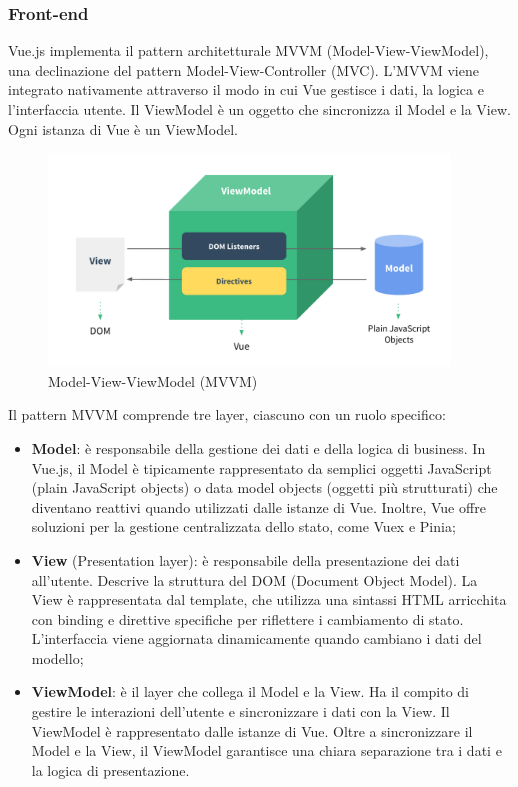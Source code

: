 \subsubsection{Front-end}

\par Vue.js implementa il pattern architetturale MVVM (Model-View-ViewModel), una declinazione del pattern Model-View-Controller (MVC). L’MVVM viene integrato nativamente attraverso il modo in cui Vue gestisce i dati, la logica e l'interfaccia utente. Il ViewModel è un oggetto che sincronizza il Model e la View. Ogni istanza di Vue è un ViewModel.

\begin{figure}[H]
  \centering
  \includegraphics[width=0.95\textwidth]{assets/Frontend/architettura_mvvm.png}
  \caption{Model-View-ViewModel (MVVM)}
\end{figure}

\par Il pattern MVVM comprende tre layer, ciascuno con un ruolo specifico:
\begin{itemize}
  \item \textbf{Model}: è responsabile della gestione dei dati e della logica di business. In Vue.js, il Model è tipicamente rappresentato da semplici oggetti JavaScript (plain JavaScript objects) o data model objects (oggetti più strutturati) che diventano reattivi quando utilizzati dalle istanze di Vue. Inoltre, Vue offre soluzioni per la gestione centralizzata dello stato, come Vuex e Pinia;
  \item \textbf{View} (Presentation layer): è responsabile della presentazione dei dati all'utente. Descrive la struttura del DOM (Document Object Model). La View è rappresentata dal template, che utilizza una sintassi HTML arricchita con binding e direttive specifiche per riflettere i cambiamento di stato. L'interfaccia viene aggiornata dinamicamente quando cambiano i dati del modello;
  \item \textbf{ViewModel}: è il layer che collega il Model e la View. Ha il compito di gestire le interazioni dell'utente e sincronizzare i dati con la View. Il ViewModel è rappresentato dalle istanze di Vue. Oltre a sincronizzare il Model e la View, il ViewModel garantisce una chiara separazione tra i dati e la logica di presentazione.
\end{itemize} 

